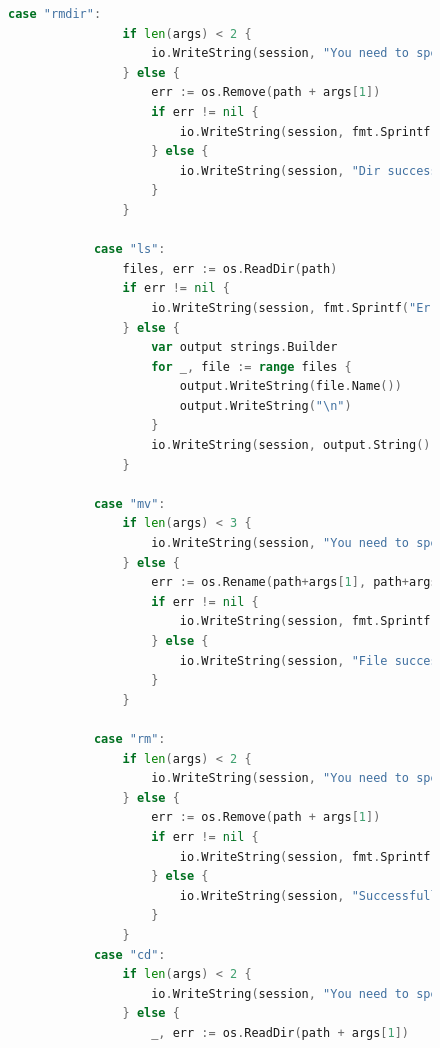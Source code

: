 \documentclass[a4paper, 14pt]{extarticle}
\begin{document}
\begin{figure}[!htb]
\begin{lstlisting}[language={Go},caption={server.go - продолжение},label={lst:code5}]
case "rmdir":
				if len(args) < 2 {
					io.WriteString(session, "You need to specify dir to delete\n")
				} else {
					err := os.Remove(path + args[1])
					if err != nil {
						io.WriteString(session, fmt.Sprintf("Failed to delete: %s\n", err))
					} else {
						io.WriteString(session, "Dir successfully deleted\n")
					}
				}

			case "ls":
				files, err := os.ReadDir(path)
				if err != nil {
					io.WriteString(session, fmt.Sprintf("Error reading dir: %s\n", err))
				} else {
					var output strings.Builder
					for _, file := range files {
						output.WriteString(file.Name())
						output.WriteString("\n")
					}
					io.WriteString(session, output.String())
				}

			case "mv":
				if len(args) < 3 {
					io.WriteString(session, "You need to specify src and dst paths\n")
				} else {
					err := os.Rename(path+args[1], path+args[2]+"/"+args[1])
					if err != nil {
						io.WriteString(session, fmt.Sprintf("Error while moving: %s\n", err))
					} else {
						io.WriteString(session, "File successfully moved\n")
					}
				}

			case "rm":
				if len(args) < 2 {
					io.WriteString(session, "You need to specify file to delete\n")
				} else {
					err := os.Remove(path + args[1])
					if err != nil {
						io.WriteString(session, fmt.Sprintf("Error while deleting: %s\n", err))
					} else {
						io.WriteString(session, "Successfully deleted\n")
					}
				}
			case "cd":
				if len(args) < 2 {
					io.WriteString(session, "You need to specify dir to change\n")
				} else {
					_, err := os.ReadDir(path + args[1])
\end{lstlisting}
\end{figure}

\newpage
\end{document}
